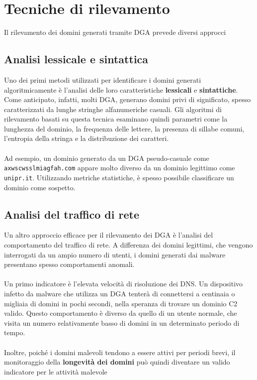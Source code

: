 \section*{Tecniche di rilevamento}
Il rilevamento dei domini generati tramite DGA prevede diversi 
approcci

\subsection*{Analisi lessicale e sintattica}
Uno dei primi metodi utilizzati per identificare i domini generati 
algoritmicamente è l'analisi delle loro caratteristiche \textbf{lessicali} 
e \textbf{sintattiche}. Come anticipato, infatti, molti DGA, generano 
domini privi di significato, spesso caratterizzati da lunghe stringhe 
alfanumeriche casuali.
Gli algoritmi di rilevamento basati su questa tecnica esaminano quindi
parametri come la lunghezza del dominio, la frequenza delle lettere, 
la presenza di sillabe comuni, l'entropia della stringa 
e la distribuzione dei caratteri.  
\\\\
Ad esempio, un dominio generato da un DGA pseudo-casuale come 
\verb|axwscwsslmiagfah.com| appare molto diverso da un dominio legittimo 
come \verb|unipr.it|. Utilizzando metriche statistiche, 
è spesso possibile classificare un dominio come sospetto. 

\subsection*{Analisi del traffico di rete}  
Un altro approccio efficace per il rilevamento dei DGA è 
l'analisi del comportamento del traffico di rete. 
A differenza dei domini legittimi, che vengono interrogati da un 
ampio numero di utenti, i domini generati dai malware presentano spesso 
comportamenti anomali.  
\\\\
Un primo indicatore è l'elevata velocità di risoluzione dei DNS. 
Un dispositivo infetto da malware che utilizza un DGA tenterà di 
connettersi a centinaia o migliaia di domini in pochi secondi,
nella speranza di trovare un dominio C2 valido. 
Questo comportamento è diverso da quello di un utente normale,
che visita un numero relativamente basso di domini in un 
determinato periodo di tempo.  
\\\\
Inoltre, poiché i domini malevoli tendono a essere attivi 
per periodi brevi, il monitoraggio della 
\textbf{longevità dei domini} può quindi diventare un valido 
indicatore per le attività malevole

